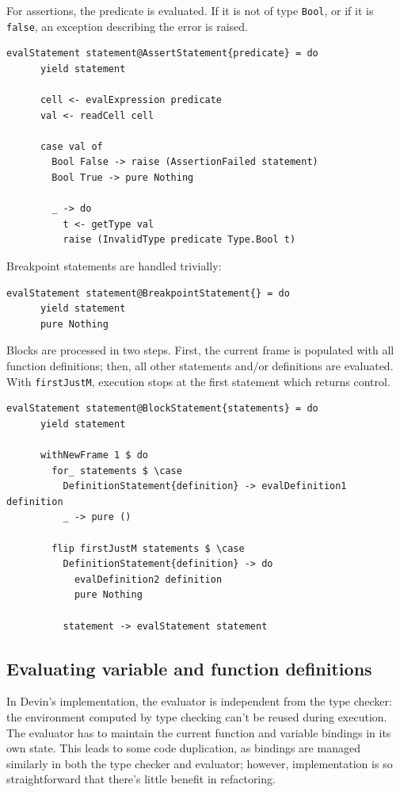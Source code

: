 \documentclass[UdineBachThesis,american,11pt]{PhdThesis}
\begin{document}
  For assertions, the predicate is evaluated. If it is not of type
  \mbox{\texttt{Bool}}, or if it is \mbox{\texttt{false}}, an exception
  describing the error is raised.

  \begin{Verbatim}[gobble=4,fontsize=\small]
    evalStatement statement@AssertStatement{predicate} = do
      yield statement

      cell <- evalExpression predicate
      val <- readCell cell

      case val of
        Bool False -> raise (AssertionFailed statement)
        Bool True -> pure Nothing

        _ -> do
          t <- getType val
          raise (InvalidType predicate Type.Bool t)
  \end{Verbatim}

  Breakpoint statements are handled trivially:

  \begin{Verbatim}[gobble=4,fontsize=\small]
    evalStatement statement@BreakpointStatement{} = do
      yield statement
      pure Nothing
  \end{Verbatim}

  Blocks are processed in two steps. First, the current frame is populated with
  all function definitions; then, all other statements and/or definitions are
  evaluated. With \mbox{\texttt{firstJustM}}, execution stops at the first
  statement which returns control.

  \begin{Verbatim}[gobble=4,fontsize=\small]
    evalStatement statement@BlockStatement{statements} = do
      yield statement

      withNewFrame 1 $ do
        for_ statements $ \case
          DefinitionStatement{definition} -> evalDefinition1 definition
          _ -> pure ()

        flip firstJustM statements $ \case
          DefinitionStatement{definition} -> do
            evalDefinition2 definition
            pure Nothing

          statement -> evalStatement statement
  \end{Verbatim}

  \subsection{Evaluating variable and function definitions}

  In Devin's implementation, the evaluator is independent from the type checker:
  the environment computed by type checking can't be reused during execution.
  The evaluator has to maintain the current function and variable bindings in
  its own state. This leads to some code duplication, as bindings are managed
  similarly in both the type checker and evaluator; however, implementation is
  so straightforward that there's little benefit in refactoring.
\end{document}
